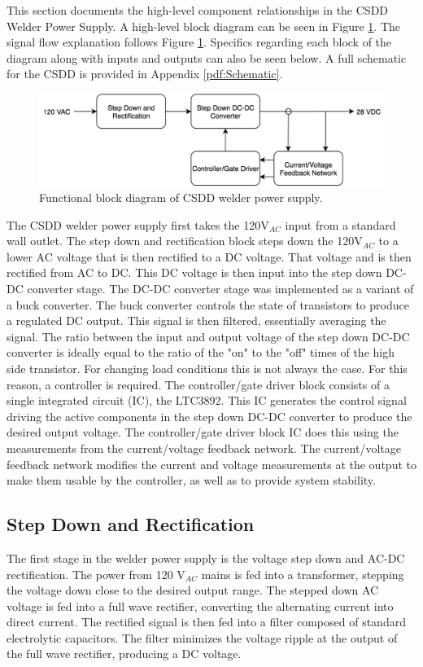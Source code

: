 \documentclass[11pt]{article}
\begin{document}
This section documents the high-level component relationships in the CSDD Welder Power Supply. A high-level block diagram can be seen in Figure \ref{block}. The signal flow explanation follows Figure \ref{block}. Specifics regarding each block of the diagram along with inputs and outputs can also be seen below. A full schematic for the CSDD is provided in Appendix \ref{pdf:Schematic}.
\newline
\newline 
\begin{figure}[ht]
    \centering
    \includegraphics[scale = 0.5]{block_diagram.png}
    \caption{Functional block diagram of CSDD welder power supply.}
    \label{block}
\end{figure}

The CSDD welder power supply first takes the 120V$_{AC}$ input from a standard wall outlet. The step down and rectification block steps down the 120V$_{AC}$ to a lower AC voltage that is then rectified to a DC voltage. That voltage and is then rectified from AC to DC. This DC voltage is then input into the step down DC-DC converter stage. The DC-DC converter stage was implemented as a variant of a buck converter. The buck converter controls the state of transistors to produce a regulated DC output. This signal is then filtered, essentially averaging the signal. The ratio between the input and output voltage of the step down DC-DC converter is ideally equal to the ratio of the "on" to the "off" times of the high side transistor. For changing load conditions this is not always the case. For this reason, a controller is required. The controller/gate driver block consists of a single integrated circuit (IC), the LTC3892. This IC generates the control signal driving the active components in the step down DC-DC converter to produce the desired output voltage. The controller/gate driver block IC does this using the measurements from the current/voltage feedback network. The current/voltage feedback network modifies the current and voltage measurements at the output to make them usable by the controller, as well as to provide system stability.


    \subsection{Step Down and Rectification}
        The first stage in the welder power supply is the voltage step down and AC-DC rectification. The power from 120 V$_{AC}$ mains is fed into a transformer, stepping the voltage down close to the desired output range. The stepped down AC voltage is fed into a full wave rectifier, converting the alternating current into direct current. The rectified signal is then fed into a filter composed of standard electrolytic capacitors. The filter minimizes the voltage ripple at the output of the full wave rectifier, producing a DC voltage.
        
\end{document}
